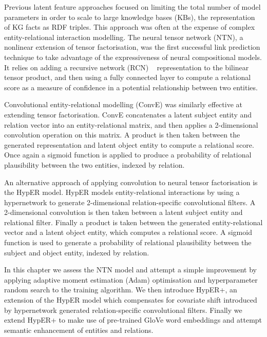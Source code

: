 \noindent Previous latent feature approaches focused on limiting the total number of model parameters in order to scale to large knowledge bases (KBs), the representation of KG facts as RDF triples. This approach was often at the expense of complex entity-relational interaction modelling. The neural tensor network (NTN), a nonlinear extension of tensor factorisation, was the first successful link prediction technique to take advantage of the expressiveness of neural compositional models. It relies on adding a recursive network (RCN) \unskip ~\citep{pollack1990recursive} representation to the bilinear tensor product, and then using a fully connected layer to compute a relational score as a measure of confidence in a potential relationship between two entities. \par

\noindent Convolutional entity-relational modelling (ConvE) was similarly effective at extending tensor factorisation. ConvE concatenates a latent subject entity and relation vector into an entity-relational matrix, and then applies a 2-dimensional convolution operation on this matrix. A product is then taken between the generated representation and latent object entity to compute a relational score. Once again a sigmoid function is applied to produce a probability of relational plausibility between the two entities, indexed by relation. \par 

\noindent An alternative approach of applying convolution to neural tensor factorisation is the HypER model. HypER models entity-relational interactions by using a hypernetwork to generate 2-dimensional relation-specific convolutional filters. A 2-dimensional convolution is then taken between a latent subject entity and relational filter. Finally a product is taken between the generated entity-relational vector and a latent object entity, which computes a relational score. A sigmoid function is used to generate a probability of relational plausibility between the subject and object entity, indexed by relation. \par

\noindent In this chapter we assess the NTN model and attempt a simple improvement by applying adaptive moment estimation (Adam) optimisation and hyperparameter random search to the training algorithm. We then introduce HypER+, an extension of the HypER model which compensates for covariate shift introduced by hypernetwork generated relation-specific convolutional filters. Finally we extend HypER+ to make use of pre-trained GloVe word embeddings and attempt semantic enhancement of entities and relations. 


